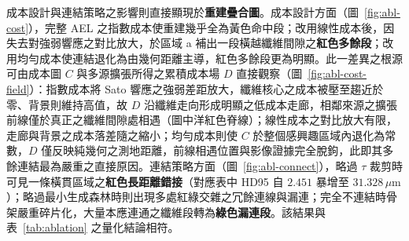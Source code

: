 成本設計與連結策略之影響則直接顯現於\textbf{重建疊合圖}。成本設計方面（圖~\ref{fig:abl-cost}），完整 AEL 之指數成本使重建幾乎全為黃色命中段；改用線性成本後，因失去對強弱響應之對比放大，於區域 a 補出一段橫越纖維間隙之\textbf{紅色多餘段}；改用均勻成本使連結退化為由幾何距離主導，紅色多餘段更為明顯。此一差異之根源可由成本圖 $C$ 與多源擴張所得之累積成本場 $D$ 直接觀察（圖~\ref{fig:abl-cost-field}）：指數成本將 Sato 響應之強弱差距放大，纖維核心之成本被壓至趨近於零、背景則維持高值，故 $D$ 沿纖維走向形成明顯之低成本走廊，相鄰來源之擴張前線僅於真正之纖維間隙處相遇（圖中洋紅色脊線）；線性成本之對比放大有限，走廊與背景之成本落差隨之縮小；均勻成本則使 $C$ 於整個感興趣區域內退化為常數，$D$ 僅反映純幾何之測地距離，前線相遇位置與影像證據完全脫鉤，此即其多餘連結最為嚴重之直接原因。連結策略方面（圖~\ref{fig:abl-connect}），略過 $\tau$ 裁剪時可見一條橫貫區域之\textbf{紅色長距離錯接}（對應表中 HD95 自 $2.451$ 暴增至 $31.328\,\mu\text{m}$）；略過最小生成森林時則出現多處紅綠交雜之冗餘連線與漏連；完全不連結時骨架嚴重碎片化，大量本應連通之纖維段轉為\textbf{綠色漏連段}。該結果與表~\ref{tab:ablation} 之量化結論相符。

